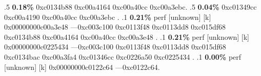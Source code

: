 \begin{profile}
{.5 \textbf{0.18\%} 0xc0134b88\newline {} 0xc00a4164\newline {} 0xc00a40cc\newline {} 0xc00a3ebc. 
.5 \textbf{0.04\%} 0xc01349cc\newline {} 0xc00a4190\newline {} 0xc00a40cc\newline {} 0xc00a3ebc\newline {} . 
.1 \textbf{ 0.21\%} perf             [unknown]              [k] 0x00000000c00a3e48\newline {} ---0xc003c100\newline {} 0xc0113f48\newline {} 0xc0113dd8\newline {} 0xc015df68\newline {} 0xc0134b88\newline {} 0xc00a4164\newline {} 0xc00a40cc\newline {} 0xc00a3e48\newline {} . 
.1 \textbf{ 0.21\%} perf             [unknown]              [k] 0x00000000c0225434\newline {} ---0xc003c100\newline {} 0xc0113f48\newline {} 0xc0113dd8\newline {} 0xc015df68\newline {} 0xc0134bac\newline {} 0xc00a3fa4\newline {} 0xc01346cc\newline {} 0xc0226a50\newline {} 0xc0225434\newline {} . 
.1 \textbf{ 0.00\%} perf             [unknown]              [k] 0x00000000c0122c64\newline {} ---0xc0122c64. 
}
\end{profile}
